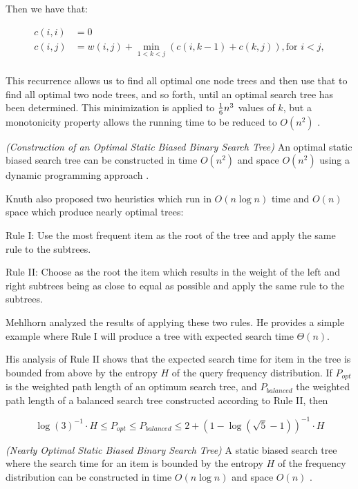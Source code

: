 \documentclass[mcs]{scsthesis}
\begin{document}
Then we have that:

\begin{equation}
    \begin{aligned}
    c(i, i) & = 0 \\
    c(i, j) & = w(i, j) + \min_{1<k<j} (c(i, k - 1) + c(k, j)), \text{for } i<j, \\
    \end{aligned}
\end{equation}

This recurrence allows us to find all optimal one node trees and then use that
to find all optimal two node trees, and so forth, until an optimal search
tree has been determined. This minimization is applied to \({1\over{6}} n^{3} \)
values of \( k \), but a monotonicity property allows the running time to be
reduced to \( O(n^2) \) \cite{knuth}.

\begin{thm} \emph{(Construction of an Optimal Static Biased Binary Search Tree)} 
An optimal static biased search tree can be constructed in time \(O(n^2)\) and
space \(O(n^2)\) using a dynamic programming approach \cite{knuth}.
\end{thm}

Knuth also proposed two heuristics which run in \(O(n \log n)\) time and
\(O(n)\) space which produce nearly optimal trees:

Rule I: Use the most frequent item as the root of the tree and apply the same
rule to the subtrees.

Rule II: Choose as the root the item which results in the weight of the left
and right subtrees being as close to equal as possible and apply the same
rule to the subtrees. 

Mehlhorn \cite{mehlhorn} analyzed the results of applying these two rules. He
provides a simple example where Rule I will produce a tree with expected
search time \(\Theta(n)\).

His analysis of Rule II shows that the expected search time for item in the tree
is bounded from above by the entropy \(H\) of the query frequency distribution.
If $P_{opt}$ is the weighted path length of an optimum search tree, and
$P_{balanced}$ the weighted path length of a balanced search tree constructed
according to Rule II, then

$$
{\log(3)}^{-1} \cdot H \le P_{opt} \le P_{balanced} \le 2 + {(1 - \log(\sqrt 5 - 1))}^{-1} \cdot H
$$

\begin{thm} \emph{(Nearly Optimal Static Biased Binary Search Tree)} 
A static biased search tree where the search time for an item is bounded by
the entropy \(H\) of the frequency distribution can be constructed in time
\(O(n \log n)\) and space \(O(n)\) \cite{mehlhorn}.
\end{thm}
\end{document}
